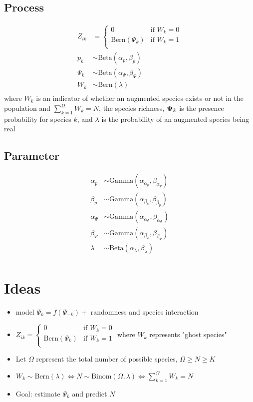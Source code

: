 \documentclass[fleqn]{article}
\def\bm#1{\mbox{\boldmath $#1$}}
\begin{document}
\subsection{Process}
%
\begin{align*}
  Z_{ik} & = 
  \begin{cases}
    0 & \mbox{if } W_k = 0\\
    \mbox{Bern}(\Psi_k) & \mbox{if } W_k = 1\\
  \end{cases}\\
  p_k & \sim \mbox{Beta}(\alpha_p, \beta_p)\\
  \Psi_k & \sim \mbox{Beta}(\alpha_\Psi, \beta_\Psi)\\
  W_k & \sim \mbox{Bern}(\lambda)\\
\end{align*}
%
where $W_k$ is an indicator of whether an augmented species exists or not in the population and $\sum_{k = 1}^\Omega W_k = N$, the species richness, $\bm{\Psi}_k$ is the presence probability for species $k$, and $\lambda$ is the probability of an augmented species being real  
%
\subsection{Parameter}
%
\begin{align*}
  \alpha_p & \sim \mbox{Gamma}(\alpha_{\alpha_p}, \beta_{\alpha_p})\\
  \beta_p & \sim \mbox{Gamma}(\alpha_{\beta_p}, \beta_{\beta_p})\\
  \alpha_\Psi & \sim \mbox{Gamma}(\alpha_{\alpha_\Psi}, \beta_{\alpha_\Psi})\\
  \beta_\Psi & \sim \mbox{Gamma}(\alpha_{\beta_\Psi}, \beta_{\beta_\Psi})\\
  \lambda & \sim \mbox{Beta}(\alpha_\lambda, \beta_\lambda)\\
\end{align*}
%
\section{Ideas}
%
\begin{itemize}
  \item model $\Psi_k = f(\Psi_{ - k}) +$ randomness and species interaction
  \item $
  Z_{ik}  = 
  \begin{cases}
    0 & \mbox{if } W_k = 0\\
    \mbox{Bern}(\Psi_k) & \mbox{if } W_k = 1\\
  \end{cases}$ where $W_k$ represents "ghost species"
  \item Let $\Omega$ represent the total number of possible species, $\Omega \geq N \geq K$
  \item $W_k \sim \mbox{Bern}(\lambda) \Leftrightarrow N \sim \mbox{Binom}(\Omega, \lambda) \Leftrightarrow \sum_{k = 1}^\Omega W_k = N$
  \item Goal: estimate $\Psi_k$ and predict $N$
\end{itemize}
%
\end{document}
